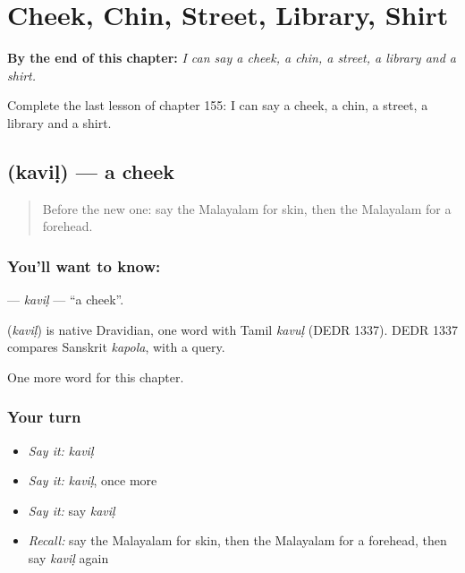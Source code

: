 
\chapter{Cheek, Chin, Street, Library, Shirt}
\label{ch:ml-cheek-chin-street-library-shirt}

\begin{chapteropening}
\textbf{By the end of this chapter:} \emph{I can say a cheek, a chin, a street, a library and a shirt.}

Complete the last lesson of chapter 155: I can say a cheek, a chin, a street, a library and a shirt.
\end{chapteropening}

\section[\texorpdfstring{\ml{കവിൾ} (kaviḷ)}{കവിൾ (kaviḷ)}]{ (kaviḷ) — a cheek}

\label{lesson:ML-C155-kavil}



\begin{quote}
Before the new one: say the Malayalam for skin, then the Malayalam for a forehead.
\end{quote}

\subsection*{You'll want to know: }
\textbf{} — \emph{kaviḷ} — \textquotedblleft{}a cheek\textquotedblright{}.

\begin{cousinweb}
\textbf{} (\emph{kaviḷ}) is native Dravidian, one word with Tamil \emph{kavuḷ} (DEDR 1337). DEDR 1337 compares Sanskrit \emph{kapola}, with a query.
\end{cousinweb}

\begin{grammarlens}[title={What you've built}]
One more word for this chapter.
\end{grammarlens}

\subsection*{Your turn}
\begin{itemize}
\raggedright
  \item \emph{Say it:} \emph{kaviḷ}
  \item \emph{Say it:} \emph{kaviḷ}, once more
  \item \emph{Say it:} say \emph{kaviḷ}
  \item \emph{Recall:} say the Malayalam for skin, then the Malayalam for a forehead, then say \emph{kaviḷ} again
\end{itemize}

